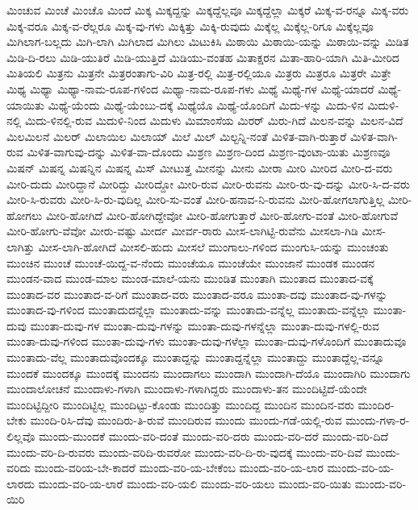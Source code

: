 {ಮಿಂಚುವ
ಮಿಂಚೆ
ಮಿಂಚೊ
ಮಿಂದೆ
ಮಿಕ್ಕ
ಮಿಕ್ಕದ್ದನ್ನು
ಮಿಕ್ಕದ್ದೆಲ್ಲವೂ
ಮಿಕ್ಕದ್ದೆಲ್ಲಾ
ಮಿಕ್ಕರೆ
ಮಿಕ್ಕ-ವ-ರನ್ನೂ
ಮಿಕ್ಕ-ವರು
ಮಿಕ್ಕ-ವರೂ
ಮಿಕ್ಕ-ವ-ರೆಲ್ಲರೂ
ಮಿಕ್ಕ-ವು-ಗಳು
ಮಿಕ್ಕಿತ್ತು
ಮಿಕ್ಕಿ-ರುವುದು
ಮಿಕ್ಕೆಲ್ಲ
ಮಿಕ್ಕೆಲ್ಲ-ರಿಗೂ
ಮಿಕ್ಕೆಲ್ಲವೂ
ಮಿಗಿಲಾಗ-ಬಲ್ಲದು
ಮಿಗಿ-ಲಾಗಿ
ಮಿಗಿಲಾದ
ಮಿಗಿಲು
ಮಿಟುಕಿಸಿ
ಮಿಠಾಯಿ
ಮಿಠಾಯಿ-ಯನ್ನು
ಮಿಠಾಯಿ-ವನ್ನು
ಮಿಡಿತ
ಮಿಡಿ-ದಿ-ರಲು
ಮಿಡಿ-ಯುತಿರೆ
ಮಿಡಿ-ಯುತ್ತಿದೆ
ಮಿಡಿಯು-ವಂತಹ
ಮಿತಾಕ್ಷರನ
ಮಿತಾ-ಹಾರಿ-ಯಾಗಿ
ಮಿತಿ-ಮೀರಿದ
ಮಿತಿಯಲಿ
ಮಿತ್ರನು
ಮಿತ್ರನೇ
ಮಿತ್ರರಂತಾಗು-ವಿರಿ
ಮಿತ್ರ-ರಲ್ಲಿ
ಮಿತ್ರ-ರಲ್ಲಿಯೂ
ಮಿತ್ರರು
ಮಿತ್ರರೂ
ಮಿತ್ರರೇ
ಮಿತ್ರೇ
ಮಿಥ್ಯ
ಮಿಥ್ಯಾ
ಮಿಥ್ಯಾ-ನಾಮ-ರೂಪ-ಗಳಿಂದ
ಮಿಥ್ಯಾ-ನಾಮ-ರೂಪ-ಗಳು
ಮಿಥ್ಯೆ
ಮಿಥ್ಯೆ-ಗಳ
ಮಿಥ್ಯೆ-ಯಾದರೆ
ಮಿಥ್ಯೆ-ಯಾಯಿತು
ಮಿಥ್ಯೆ-ಯೆಂದು
ಮಿಥ್ಯೆ-ಯೆಂಬು-ದಕ್ಕೆ
ಮಿಥ್ಯೆಯೊ
ಮಿಥ್ಯೆ-ಯೊಂದಿಗೆ
ಮಿದು-ಳನ್ನು
ಮಿದು-ಳಿನ
ಮಿದುಳಿ-ನಲ್ಲಿ
ಮಿದು-ಳಿನಲ್ಲಿ-ರುವ
ಮಿದುಳಿ-ನಿಂದ
ಮಿದುಳು
ಮಿಮಾಂಸೆಯ
ಮಿರರ್
ಮಿರು-ಗಿದೆ
ಮಿಲನ-ವನ್ನು
ಮಿಲನ-ವಿದೆ
ಮಿಲಮಿಲನೆ
ಮಿಲರ್
ಮಿಲಾಯಿಲ
ಮಿಲಾಯ್
ಮಿಲೆ
ಮಿಲ್
ಮಿಲ್ಟನ್ನಿ-ನಂತೆ
ಮಿಳಿತ-ವಾಗಿ-ರುತ್ತಾರೆ
ಮಿಳಿತ-ವಾಗಿ-ರುವ
ಮಿಳಿತ-ವಾಗುವು-ದನ್ನು
ಮಿಳಿತ-ವಾ-ದೊಂದು
ಮಿಶ್ರಣ
ಮಿಶ್ರಣ-ದಿಂದ
ಮಿಶ್ರಣ-ವುಂಟಾ-ಯಿತು
ಮಿಶ್ರಣವೂ
ಮಿಷನ್
ಮಿಷನ್ನ
ಮಿಷನ್ನಿನ
ಮಿಷನ್ನ
ಮಿಸ್
ಮೀಟುತ್ತ
ಮೀನನ್ನು
ಮೀನು
ಮೀರಾ
ಮೀರಿ
ಮೀರಿದ
ಮೀರಿ-ದ-ವರು
ಮೀರಿ-ದುದು
ಮೀರಿದ್ದಾನೆ
ಮೀರಿದ್ದು
ಮೀರಿದ್ದೋ
ಮೀರಿ-ರುವ
ಮೀರಿ-ರುವನು
ಮೀರಿ-ರು-ವು-ದನ್ನು
ಮೀರಿ-ಸಿ-ದ-ವರು
ಮೀರಿ-ಸಿ-ರುವರು
ಮೀರಿ-ಸಿ-ರು-ವುದಿಲ್ಲ
ಮೀರಿ-ಸು-ವಂತೆ
ಮೀರಿ-ಹನಾವ-ನಿ-ರುವನು
ಮೀರಿ-ಹೋಗಲಾಗುತ್ತಿಲ್ಲ
ಮೀರಿ-ಹೋಗಲು
ಮೀರಿ-ಹೋಗಿದೆ
ಮೀರಿ-ಹೋಗಿದ್ದೇವೋ
ಮೀರಿ-ಹೋಗುತ್ತಾರೆ
ಮೀರಿ-ಹೋಗು-ವಂತೆ
ಮೀರಿ-ಹೋಗುವೆ
ಮೀರಿ-ಹೋಗು-ವೆವೋ
ಮೀರು-ವಷ್ಟು
ಮೀರ್ದ
ಮೀರ್ವ-ರಾರು
ಮೀಸ-ಲಾಗಿಟ್ಟಿ-ರುವೆನು
ಮೀಸಲಾ-ಗಿಡಿ
ಮೀಸ-ಲಾಗಿತ್ತು
ಮೀಸ-ಲಾಗಿ-ಹೋಗಿದೆ
ಮೀಸಲಿ-ಹುದು
ಮೀಸಲೆ
ಮುಂಗಾಲು-ಗಳಿಂದ
ಮುಂಗುಸಿ-ಯನ್ನು
ಮುಂಚಂತು
ಮುಂಚಿನ
ಮುಂಚೆ
ಮುಂಚೆ-ಯಿದ್ದ-ವ-ನೆಂದು
ಮುಂಚೆಯೂ
ಮುಂಚೆಯೇ
ಮುಂಜಾನೆ
ಮುಂಡಕ
ಮುಂಡನ
ಮುಂಡನ-ವಾದ
ಮುಂಡ-ಮಾಲ
ಮುಂಡ-ಮಾಲೆ-ಯನು
ಮುಂಡಿತ
ಮುಂತಾಗಿ
ಮುಂತಾದ
ಮುಂತಾದ-ವಕ್ಕೆ
ಮುಂತಾದ-ವರ
ಮುಂತಾದ-ವ-ರಿಗೆ
ಮುಂತಾದ-ವರು
ಮುಂತಾದ-ವರೂ
ಮುಂತಾ-ದವು
ಮುಂತಾದ-ವು-ಗಳನ್ನು
ಮುಂತಾದ-ವು-ಗಳಿಂದ
ಮುಂತಾದುದನ್ನೆಲ್ಲಾ
ಮುಂತಾದು-ವನ್ನು
ಮುಂತಾದು-ವನ್ನೆಲ್ಲ
ಮುಂತಾದು-ವನ್ನೆಲ್ಲಾ
ಮುಂತಾ-ದುವು
ಮುಂತಾ-ದುವು-ಗಳ
ಮುಂತಾ-ದುವು-ಗಳನ್ನು
ಮುಂತಾ-ದುವು-ಗಳನ್ನೆಲ್ಲಾ
ಮುಂತಾ-ದುವು-ಗಳಲ್ಲಿ-ರುವ
ಮುಂತಾ-ದುವು-ಗಳಿಂದ
ಮುಂತಾ-ದುವು-ಗಳು
ಮುಂತಾ-ದುವು-ಗಳೆಲ್ಲಾ
ಮುಂತಾ-ದುವು-ಗಳೊಂದಿಗೆ
ಮುಂತಾದುವೂ
ಮುಂತಾದು-ವೆಲ್ಲ
ಮುಂತಾದುವೊಂದಕ್ಕೂ
ಮುಂತಾದ್ದನ್ನು
ಮುಂತಾದ್ದನ್ನೆಲ್ಲಾ
ಮುಂತಾದ್ದು
ಮುಂತಾದ್ದೆಲ್ಲ-ವನ್ನೂ
ಮುಂದಕೆ
ಮುಂದಕ್ಕೂ
ಮುಂದಕ್ಕೆ
ಮುಂದನು
ಮುಂದಾಗಲು
ಮುಂದಾಗಿ
ಮುಂದಾಗಿ-ದೆಯೊ
ಮುಂದಾಗಿರಿ
ಮುಂದಾಗು
ಮುಂದಾಲೋಚನೆ
ಮುಂದಾಳು-ಗಳಾಗಿ
ಮುಂದಾಳು-ಗಳಾಗಿದ್ದರು
ಮುಂದಾಳು-ತನ
ಮುಂದಿಟ್ಟಿದೆ-ಯೆಂದೇ
ಮುಂದಿಟ್ಟಿದ್ದೀರಿ
ಮುಂದಿಟ್ಟಿಲ್ಲ
ಮುಂದಿಟ್ಟು-ಕೊಂಡು
ಮುಂದಿತ್ತು
ಮುಂದಿದ್ದ
ಮುಂದಿನ
ಮುಂದಿನ-ವರು
ಮುಂದಿರ-ಬೇಕು
ಮುಂದಿ-ರಿಸಿ-ದೆವು
ಮುಂದಿರು-ತಿ-ರುವೆ
ಮುಂದಿರುವ
ಮುಂದು
ಮುಂದು-ಗಡೆ-ಯಲ್ಲಿ-ರುವ
ಮುಂದು-ಗಳಾ-ರ-ಲಿಲ್ಲವೊ
ಮುಂದು-ಮುಂದಕೆ
ಮುಂದು-ವರಿ-ದಂತೆ
ಮುಂದು-ವರಿ-ದರು
ಮುಂದು-ವರಿ-ದರೆ
ಮುಂದು-ವರಿ-ದಿದೆ
ಮುಂದು-ವರಿ-ದಿ-ರುವರು
ಮುಂದು-ವರಿದಿ-ರುವರೋ
ಮುಂದು-ವರಿ-ದಿ-ರು-ವುದಕ್ಕೆ
ಮುಂದು-ವರಿ-ದಿವೆ
ಮುಂದು-ವರಿದು
ಮುಂದು-ವರಿಯ-ಬೇ-ಕಾದರೆ
ಮುಂದು-ವರಿ-ಯ-ಬೇಕೆಂಬ
ಮುಂದು-ವರಿ-ಯ-ಲಾರ
ಮುಂದು-ವರಿ-ಯ-ಲಾರದು
ಮುಂದು-ವರಿ-ಯ-ಲಾರೆ
ಮುಂದು-ವರಿ-ಯಲಿ
ಮುಂದು-ವರಿ-ಯಲು
ಮುಂದು-ವರಿ-ಯಿತು
ಮುಂದು-ವರಿ-ಯಿರಿ
}
